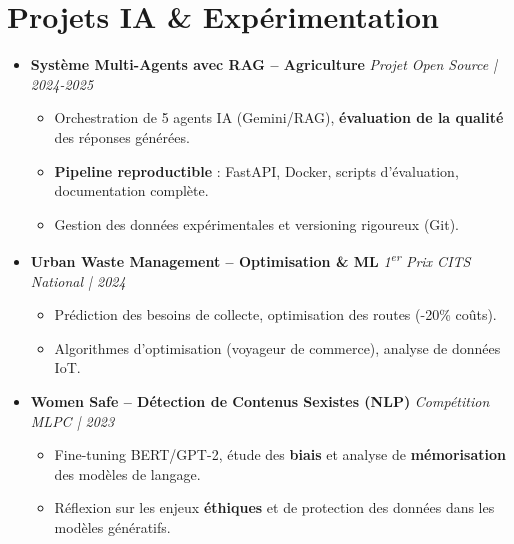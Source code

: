 \documentclass[a4paper,11pt]{article}
\begin{document}
\section{Projets IA \& Expérimentation}
\begin{itemize}[leftmargin=*, label={-}]

\item \textbf{Système Multi-Agents avec RAG -- Agriculture} \hfill \textit{Projet Open Source | 2024-2025}
\vspace{-2pt}
    \begin{itemize}[leftmargin=0.4cm, nosep, label=\tiny$\bullet$]
        \item \small{Orchestration de 5 agents IA (Gemini/RAG), \textbf{évaluation de la qualité} des réponses générées.}
        \item \small{\textbf{Pipeline reproductible} : FastAPI, Docker, scripts d'évaluation, documentation complète.}
        \item \small{Gestion des données expérimentales et versioning rigoureux (Git).}
    \end{itemize}
\vspace{3pt}

\item \textbf{Urban Waste Management -- Optimisation \& ML} \hfill \textit{1\textsuperscript{er} Prix CITS National | 2024}
\vspace{-2pt}
    \begin{itemize}[leftmargin=0.4cm, nosep, label=\tiny$\bullet$]
        \item \small{Prédiction des besoins de collecte, optimisation des routes (-20\% coûts).}
        \item \small{Algorithmes d'optimisation (voyageur de commerce), analyse de données IoT.}
    \end{itemize}
\vspace{3pt}

\item \textbf{Women Safe -- Détection de Contenus Sexistes (NLP)} \hfill \textit{Compétition MLPC | 2023}
\vspace{-2pt}
    \begin{itemize}[leftmargin=0.4cm, nosep, label=\tiny$\bullet$]
        \item \small{Fine-tuning BERT/GPT-2, étude des \textbf{biais} et analyse de \textbf{mémorisation} des modèles de langage.}
        \item \small{Réflexion sur les enjeux \textbf{éthiques} et de protection des données dans les modèles génératifs.}
    \end{itemize}
\vspace{3pt}


\end{itemize}
\end{document}
